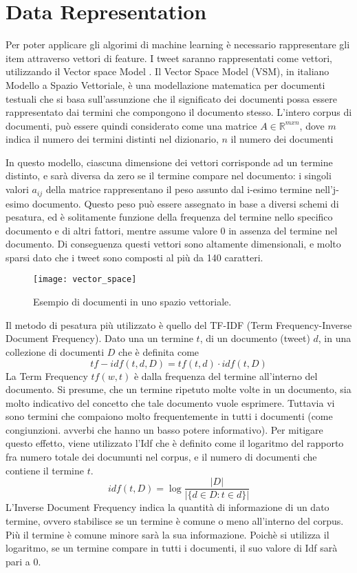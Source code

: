 \section{Data Representation} 
Per poter applicare gli algorimi di machine learning è necessario rappresentare gli item attraverso vettori di feature.
I tweet saranno rappresentati come vettori, utilizzando il Vector space Model \cite{Salton:1989:ATP:77013}. 
Il Vector Space Model (VSM), in italiano Modello a Spazio Vettoriale, è una modellazione matematica per documenti testuali che si basa sull'assunzione che il significato dei documenti possa essere rappresentato dai termini che compongono il documento stesso. 
L'intero corpus di documenti, può essere quindi considerato come una matrice $A \in \mathbb{R}^{mxn}$, dove $m$  indica il numero dei termini distinti nel dizionario, $n$  il numero dei documenti 

In questo modello, ciascuna dimensione dei vettori corrisponde ad un termine distinto, e sarà diversa da zero se il termine compare nel documento: i singoli valori $a_{ij}$ della matrice rappresentano il peso
assunto dal i-esimo termine nell’j-esimo documento. Questo peso può essere assegnato in base a  diversi schemi di pesatura, ed è solitamente funzione della frequenza del termine nello specifico documento e di altri fattori, mentre assume valore 0 in assenza del
termine nel documento. Di conseguenza questi vettori sono altamente dimensionali, e molto sparsi dato che i tweet sono composti al più da 140 caratteri. 

\begin{figure}[h]
    \centering
    \texttt{[image: vector\_space]}
    \caption{Esempio di documenti in uno spazio vettoriale.}
    \label{fig:dbpedia}
\end{figure}  


Il metodo di pesatura più utilizzato è quello del TF-IDF (Term Frequency-Inverse Document Frequency).
Dato una un termine  $t$, di un documento (tweet) $d$, in una collezione di documenti $D$
che è definita come  
\begin{equation}
tf-idf(t,d, D) =  tf(t,d)\cdot idf(t,D)
\end{equation}
La Term Frequency $tf(w,t)$ è dalla frequenza del termine all'interno del documento. Si presume, che un termine     ripetuto molte volte in un documento, sia molto indicativo del concetto che tale documento vuole esprimere.
Tuttavia vi sono termini che compaiono molto frequentemente in tutti i documenti (come congiunzioni. avverbi che hanno un basso potere informativo).
Per  mitigare questo effetto, viene utilizzato l'Idf che è definito come il logaritmo del rapporto fra numero totale dei documunti nel corpus, e il numero di documenti che contiene il termine $t$.
\begin{equation}
idf(t, D) =  \log \frac{|D|}{|\{d \in D: t \in d\}|}
\end{equation}
L'Inverse Document Frequency   indica la quantità di informazione di un dato termine, ovvero stabilisce se un termine è comune o meno all'interno del corpus. Più il termine è comune minore sarà la sua informazione. 
Poichè si utilizza il logaritmo, se un termine compare in tutti i documenti, il suo valore di Idf sarà pari a 0.

